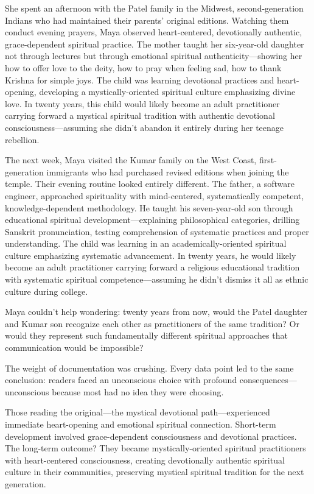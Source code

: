 \documentclass[12pt,twoside]{book}
\begin{document}
She spent an afternoon with the Patel family in the Midwest, second-generation Indians who had maintained their parents' original editions. Watching them conduct evening prayers, Maya observed heart-centered, devotionally authentic, grace-dependent spiritual practice. The mother taught her six-year-old daughter not through lectures but through emotional spiritual authenticity—showing her how to offer love to the deity, how to pray when feeling sad, how to thank Krishna for simple joys. The child was learning devotional practices and heart-opening, developing a mystically-oriented spiritual culture emphasizing divine love. In twenty years, this child would likely become an adult practitioner carrying forward a mystical spiritual tradition with authentic devotional consciousness—assuming she didn't abandon it entirely during her teenage rebellion.

The next week, Maya visited the Kumar family on the West Coast, first-generation immigrants who had purchased revised editions when joining the temple. Their evening routine looked entirely different. The father, a software engineer, approached spirituality with mind-centered, systematically competent, knowledge-dependent methodology. He taught his seven-year-old son through educational spiritual development—explaining philosophical categories, drilling Sanskrit pronunciation, testing comprehension of systematic practices and proper understanding. The child was learning in an academically-oriented spiritual culture emphasizing systematic advancement. In twenty years, he would likely become an adult practitioner carrying forward a religious educational tradition with systematic spiritual competence—assuming he didn't dismiss it all as ethnic culture during college.

Maya couldn't help wondering: twenty years from now, would the Patel daughter and Kumar son recognize each other as practitioners of the same tradition? Or would they represent such fundamentally different spiritual approaches that communication would be impossible?

The weight of documentation was crushing. Every data point led to the same conclusion: readers faced an unconscious choice with profound consequences—unconscious because most had no idea they were choosing.

Those reading the original—the mystical devotional path—experienced immediate heart-opening and emotional spiritual connection. Short-term development involved grace-dependent consciousness and devotional practices. The long-term outcome? They became mystically-oriented spiritual practitioners with heart-centered consciousness, creating devotionally authentic spiritual culture in their communities, preserving mystical spiritual tradition for the next generation.
\end{document}
